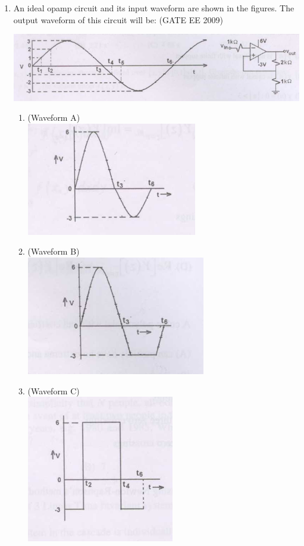 \documentclass[journal,12pt,onecolumn]{IEEEtran}
\theoremstyle{remark}
\begin{document}
\begin{flushleft}
\begin{enumerate}
\item An ideal opamp circuit and its input waveform are shown in the figures. The output waveform of this circuit will be:
\hfill(GATE EE 2009)

\begin{center}
    \includegraphics[width=0.7\columnwidth]{figs/Screenshot 2025-08-08 214119.png}
  \label{fig:placeholder}

\end{center}

\begin{enumerate}
    \item (Waveform A) \\
    \includegraphics[width=0.4\columnwidth]{figs/Screenshot 2025-08-08 214145.png}
    \item (Waveform B) \\
    \includegraphics[width=0.4\columnwidth]{figs/Screenshot 2025-08-08 214154.png}
    \item (Waveform C) \\
    \includegraphics[width=0.4\columnwidth]{figs/Screenshot 2025-08-08 214200.png}

\end{enumerate}
\end{enumerate}
\end{flushleft}
\end{document}
